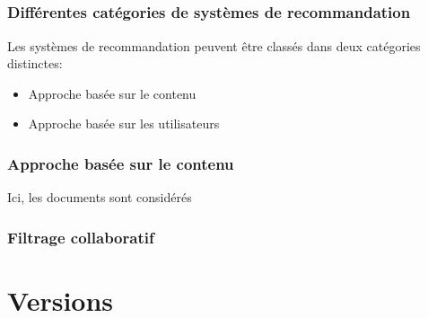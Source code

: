 \documentclass{beamer}
\begin{document}
        \subsection{}
            \begin{frame}
                \frametitle{Différentes catégories de systèmes de recommandation}
                Les systèmes de recommandation peuvent être classés dans deux catégories distinctes:
                \pause
                \begin{itemize}
                    \item Approche basée sur le contenu
                    \pause
                    \item Approche basée sur les utilisateurs
                \end{itemize}
            \end{frame}
            \begin{frame}
                \frametitle{Approche basée sur le contenu}
                Ici, les documents sont considérés
            \end{frame}
            \begin{frame}
                \frametitle{Filtrage collaboratif}
            \end{frame}

    \section{Versions}
\end{document}
